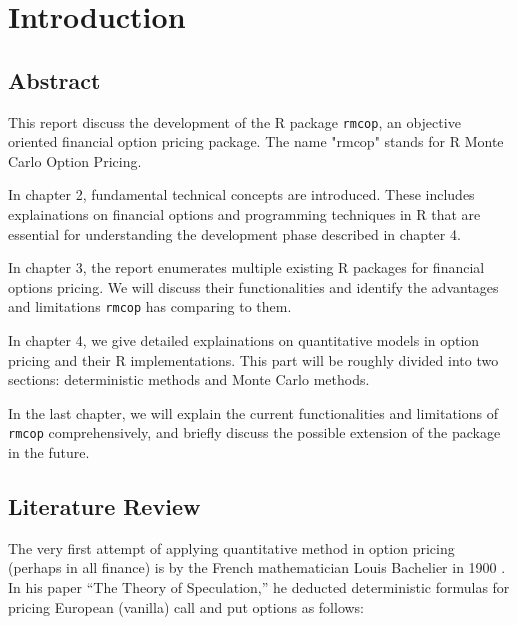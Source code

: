 \chapter{Introduction}

\section{Abstract}
This report discuss the development of the R package \texttt{rmcop}, an objective oriented financial option pricing package. The name "rmcop" stands for R Monte Carlo Option Pricing.

In chapter 2, fundamental technical concepts are introduced. These includes explainations on financial options and programming techniques in R that are essential for understanding the development phase described in chapter 4.

In chapter 3, the report enumerates multiple existing R packages for financial options pricing. We will discuss their functionalities and identify the advantages and limitations \texttt{rmcop} has comparing to them.

In chapter 4, we give detailed explainations on quantitative models in option pricing and their R implementations. This part will be roughly divided into two sections: deterministic methods and Monte Carlo methods.

In the last chapter, we will explain the current functionalities and limitations of \texttt{rmcop} comprehensively, and briefly discuss the possible extension of the package in the future.

\section{Literature Review}
The very first attempt of applying quantitative method in option pricing (perhaps in all finance) is by the French mathematician Louis Bachelier in 1900 \cite{Bachelier1900}. In his paper ``The Theory of Speculation,'' he deducted deterministic formulas for pricing European (vanilla) call and put options as follows:


